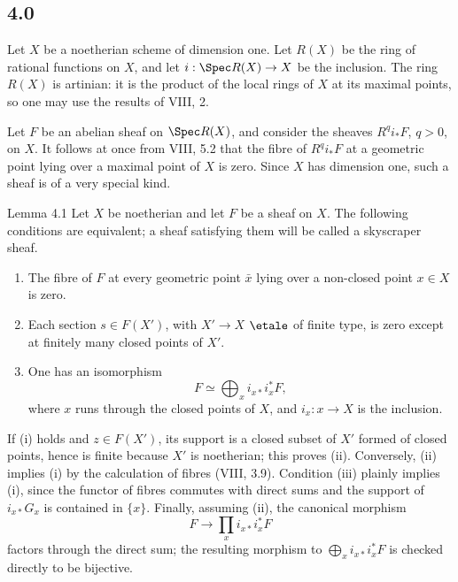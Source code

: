 \subsection*{4.0}
Let \(X\) be a noetherian scheme of dimension one. Let \(R(X)\) be the ring of rational functions on \(X\), and let \(i:\Spec R(X)\to X\) be the inclusion. The ring \(R(X)\) is artinian: it is the product of the local rings of \(X\) at its maximal points, so one may use the results of VIII, 2.

Let \(F\) be an abelian sheaf on \(\Spec R(X)\), and consider the sheaves \(R^qi_*F\), \(q>0\), on \(X\). It follows at once from VIII, 5.2 that the fibre of \(R^qi_*F\) at a geometric point lying over a maximal point of \(X\) is zero. Since \(X\) has dimension one, such a sheaf is of a very special kind.

\begin{statement}{Lemma 4.1}
Let \(X\) be noetherian and let \(F\) be a sheaf on \(X\). The following conditions are equivalent; a sheaf satisfying them will be called a skyscraper sheaf.
\begin{enumerate}[label=(\roman*)]
\item The fibre of \(F\) at every geometric point \(\bar x\) lying over a non-closed point \(x\in X\) is zero.
\item Each section \(s\in F(X')\), with \(X'\to X\) \(\etale\) of finite type, is zero except at finitely many closed points of \(X'\).
\item One has an isomorphism
\[
F\simeq \bigoplus_x i_{x*}i_x^*F,
\]
where \(x\) runs through the closed points of \(X\), and \(i_x:x\to X\) is the inclusion.
\end{enumerate}
\end{statement}

\begin{prooftext}
If (i) holds and \(z\in F(X')\), its support is a closed subset of \(X'\) formed of closed points, hence is finite because \(X'\) is noetherian; this proves (ii). Conversely, (ii) implies (i) by the calculation of fibres (VIII, 3.9). Condition (iii) plainly implies (i), since the functor of fibres commutes with direct sums and the support of \(i_{x*}G_x\) is contained in \(\{x\}\). Finally, assuming (ii), the canonical morphism
\[
F\longrightarrow \prod_x i_{x*}i_x^*F
\]
factors through the direct sum; the resulting morphism to \(\bigoplus_x i_{x*}i_x^*F\) is checked directly to be bijective.
\end{prooftext}

